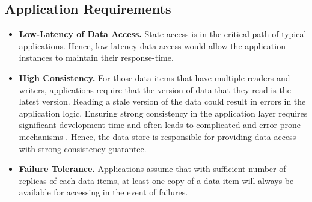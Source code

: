 \subsection{Application Requirements}
\begin{itemize}
\item \textbf{Low-Latency of Data Access. } State access is in the critical-path of typical applications. Hence, low-latency data access would allow the application instances to maintain their response-time.
\item \textbf{High Consistency. } For those data-items that have multiple readers and writers, applications require that the version of data that they read is the latest version. Reading a stale version of the data could result in errors in the application logic. Ensuring strong consistency in the application layer requires significant development time and often leads to complicated and error-prone mechanisms \cite{shute2013f1}. Hence, the data store is responsible for providing data access with strong consistency guarantee.
\item \textbf{Failure Tolerance. } Applications assume that with sufficient number of replicas of each data-items, at least one copy of a data-item will always be available for accessing in the event of failures.
\end{itemize}

